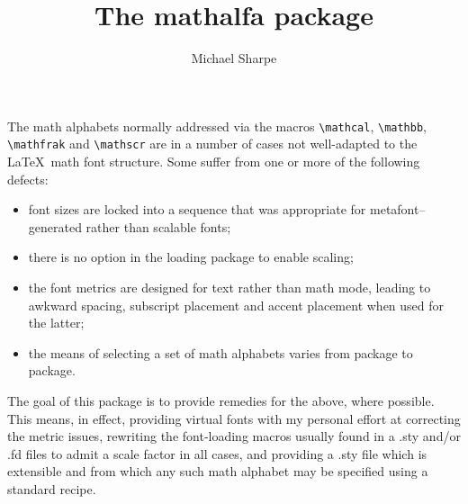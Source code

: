 \documentclass[11pt]{amsart}
\title{The \textsf{mathalfa} package}
\author{Michael Sharpe}
\date{}
\begin{document}
\maketitle
The math alphabets normally addressed via the macros \verb|\mathcal|, \verb|\mathbb|, \verb|\mathfrak| and \verb|\mathscr| are in a number of cases not well-adapted to the \LaTeX\ math font structure. Some suffer from one or more of the following defects:
\begin{itemize}
\item
font sizes are locked into  a sequence that was appropriate for \textsf{metafont}--generated rather than  scalable fonts;
\item there is no option in the loading package to enable scaling;
\item  the font metrics are designed for text rather than math mode, leading to awkward spacing, subscript placement and accent placement when used for the latter;
\item the means of selecting a set of math alphabets varies from package to package.
\end{itemize}
The goal of this package is to provide remedies for the above, where  possible. This means, in effect, providing virtual fonts with my personal effort at correcting the metric issues, rewriting the font-loading macros usually found in a \textsf{.sty} and/or \textsf{.fd} files to admit a scale factor in all cases, and providing a \textsf{.sty} file which is extensible and from which any such math alphabet may be specified using a standard recipe. 
\end{document}
